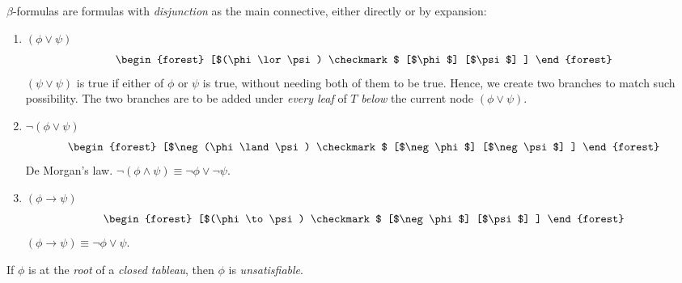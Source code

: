 \begin{definition}
    $\beta$-formulas are formulas with \textit{disjunction} as the main connective,
    either directly or by expansion:
    
    \begin{enumerate}
        \item $(\phi \lor \psi)$
            \begin{equation}
                \begin{forest}
                    [$(\phi \lor \psi) \checkmark$
                        [$\phi$]
                        [$\psi$]
                    ]
                \end{forest}
            \end{equation}
            $(\psi \lor \psi)$ is true if either of $\phi$ or $\psi$ is true,
            without needing both of them to be true. Hence, we create two
            branches to match such possibility. The two branches are to be
            added under \textit{every leaf} of $T$ \textit{below} the current 
            node $(\phi \lor \psi)$.
        \item $\neg (\phi \lor \psi)$
            \begin{equation}
                \begin{forest}
                    [$\neg (\phi \land \psi) \checkmark$
                        [$\neg \phi$]
                        [$\neg \psi$]
                    ]
                \end{forest}
            \end{equation}
            De Morgan's law. $\neg (\phi \land \psi)
            \equiv \neg \phi \lor \neg \psi$.
        \item $(\phi \to \psi)$
            \begin{equation}
                \begin{forest}
                    [$(\phi \to \psi) \checkmark$
                        [$\neg \phi$]
                        [$\psi$]
                    ]
                \end{forest}
            \end{equation}
            $(\phi \to \psi) \equiv \neg \phi \lor \psi$.
    \end{enumerate}
\end{definition}

\begin{definition}
    If $\phi$ is at the \textit{root} of a \textit{closed tableau}, then
    $\phi$ is \textit{unsatisfiable}.
\end{definition}

